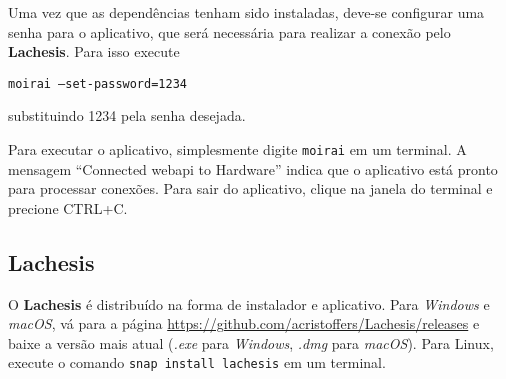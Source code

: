 Uma vez que as dependências tenham sido instaladas, deve-se configurar uma senha
para o aplicativo, que será necessária para realizar a conexão pelo
\textbf{Lachesis}. Para isso execute

\texttt{moirai --set-password=1234}

substituindo 1234 pela senha desejada.

Para executar o aplicativo, simplesmente digite \texttt{moirai} em um
terminal. A mensagem \enquote{Connected webapi to Hardware} indica que o
aplicativo está pronto para processar conexões. Para sair do aplicativo, clique
na janela do terminal e precione CTRL+C.

\subsection{Lachesis}%
\label{subsec:install-lachesis}

O \textbf{Lachesis} é distribuído na forma de instalador e aplicativo. Para
\textit{Windows} e \textit{macOS}, vá para a página
\url{https://github.com/acristoffers/Lachesis/releases} e baixe a versão mais
atual (\textit{.exe} para \textit{Windows}, \textit{.dmg} para \textit{macOS}).
Para Linux, execute o comando \texttt{snap install lachesis} em um
terminal.
